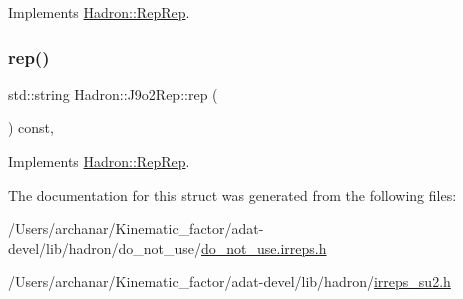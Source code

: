 Implements \mbox{\hyperlink{structHadron_1_1RepRep_ab3213025f6de249f7095892109575fde}{Hadron\+::\+Rep\+Rep}}.

\mbox{\label{structHadron_1_1J9o2Rep_ad83e9b0b6221fcaeeeed5f2653890334}} 
\subsubsection{\texorpdfstring{rep()}{rep()}\hspace{0.1cm}{\footnotesize\ttfamily [5/5]}}
{\footnotesize\ttfamily std\+::string Hadron\+::\+J9o2\+Rep\+::rep (\begin{DoxyParamCaption}{ }\end{DoxyParamCaption}) const\hspace{0.3cm}{\ttfamily [inline]}, {\ttfamily [virtual]}}



Implements \mbox{\hyperlink{structHadron_1_1RepRep_ab3213025f6de249f7095892109575fde}{Hadron\+::\+Rep\+Rep}}.



The documentation for this struct was generated from the following files\+:\begin{DoxyCompactItemize}
\item 
/\+Users/archanar/\+Kinematic\+\_\+factor/adat-\/devel/lib/hadron/do\+\_\+not\+\_\+use/\mbox{\hyperlink{adat-devel_2lib_2hadron_2do__not__use_2do__not__use_8irreps_8h}{do\+\_\+not\+\_\+use.\+irreps.\+h}}\item 
/\+Users/archanar/\+Kinematic\+\_\+factor/adat-\/devel/lib/hadron/\mbox{\hyperlink{adat-devel_2lib_2hadron_2irreps__su2_8h}{irreps\+\_\+su2.\+h}}\end{DoxyCompactItemize}
